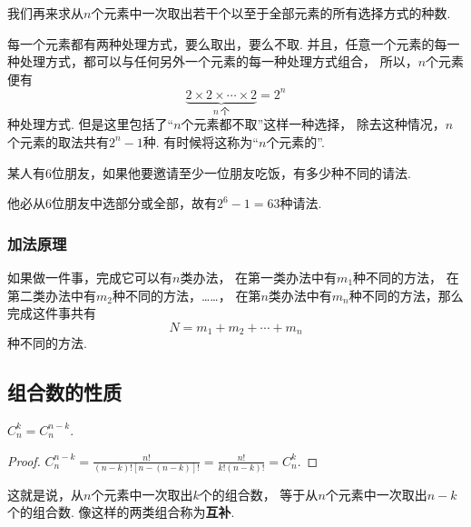 我们再来求从\(n\)个元素中一次取出若干个以至于全部元素的所有选择方式的种数.

每一个元素都有两种处理方式，要么取出，要么不取.
并且，任意一个元素的每一种处理方式，都可以与任何另外一个元素的每一种处理方式组合，
所以，\(n\)个元素便有\[
	\underbrace{2 \times 2 \times \dotsm \times 2}_{n\ \text{个}}
	= 2^n
\]种处理方式.
但是这里包括了“\(n\)个元素都不取”这样一种选择，
除去这种情况，\(n\)个元素的取法共有\(2^n-1\)种.
有时候将这称为“\(n\)个元素的”.

\begin{example}
某人有6位朋友，如果他要邀请至少一位朋友吃饭，有多少种不同的请法.
\begin{solution}
他必从6位朋友中选部分或全部，故有\(2^6-1=63\)种请法.
\end{solution}
\end{example}

\subsubsection{加法原理}
如果做一件事，完成它可以有\(n\)类办法，
在第一类办法中有\(m_1\)种不同的方法，
在第二类办法中有\(m_2\)种不同的方法，……，
在第\(n\)类办法中有\(m_n\)种不同的方法，那么完成这件事共有\[
N = m_1 + m_2 + \dotsb + m_n
\]种不同的方法.



\subsection{组合数的性质}
\begin{property}\label{theorem:组合数性质1}
\(C_n^k = C_n^{n-k}\).
\begin{proof}
\(
C_n^{n-k}
= \frac{n!}{(n-k)! [n-(n-k)]!}
= \frac{n!}{k! (n-k)!}
= C_n^k
\).
\end{proof}
\end{property}
这就是说，从\(n\)个元素中一次取出\(k\)个的组合数，
等于从\(n\)个元素中一次取出\(n-k\)个的组合数.
像这样的两类组合称为\textbf{互补}.

